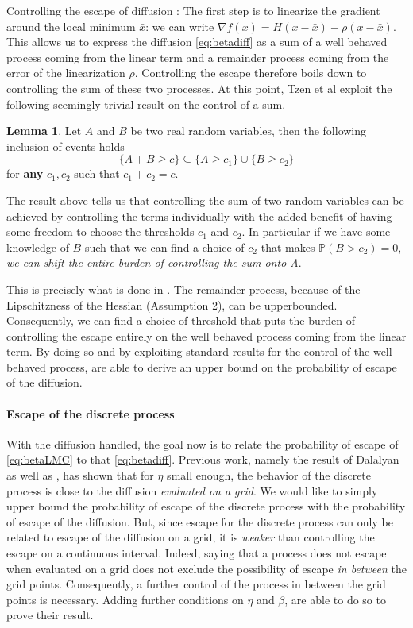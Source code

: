\documentclass[11pt,twoside]{article}
\theoremstyle{definition}
\newtheorem{lemma}[theorem]{Lemma}
\newcommand{\Prb}{\mathbb{P}}
\begin{document}
\begin{paragraph}{Controlling the escape of diffusion :} The first step is to linearize the gradient around the local minimum $\bar{x}$: we can write $\nabla f(x) = H(x-\bar{x}) - \rho(x - \bar{x})$. This allows us to express the diffusion \eqref{eq:betadiff} as a sum of a well behaved process coming from the linear term and a remainder process coming from the error of the linearization $\rho$. Controlling the escape therefore boils down to controlling the sum of these two processes. At this point, Tzen et al exploit the following seemingly trivial result on the control of a sum.
\begin{lemma}
Let $A$ and $B$ be two real random variables, then the following inclusion of events holds 
\[
\{A + B \geq c \} \subseteq  \{A \geq c_1\} \cup \{ B \geq c_2\}
\]
for \textbf{any} $c_1, c_2$ such that $c_1 + c_2 = c$. 
\end{lemma}

The result above tells us that controlling the sum of two random variables can be achieved by controlling the terms individually with the added benefit of having some freedom to choose the thresholds $c_1$ and $c_2$. In particular if we have some knowledge of $B$ such that we can find a choice of $c_2$ that makes $\Prb(B > c_2) = 0$, \textit{we can shift the entire burden of controlling the sum onto A}.

This is precisely what is done in \cite{tzen_local_2018}. The remainder process, because of the Lipschitzness of the Hessian (Assumption 2), can be upperbounded. Consequently, we can find a choice of threshold that puts the burden of controlling the escape entirely on the well behaved process coming from the linear term. By doing so and by exploiting standard results for the control of the well behaved process, \cite{tzen_local_2018} are able to derive an upper bound on the probability of escape of the diffusion. 
\end{paragraph}

\paragraph{Escape of the discrete process} With the diffusion handled, the goal now is to relate the probability of escape of \eqref{eq:betaLMC} to that \eqref{eq:betadiff}. Previous work, namely the result of Dalalyan \cite{dalalyan_theoretical_2016} as well as \cite{raginsky_non-convex_2017}, has shown that for $\eta$ small enough, the behavior of the discrete process is close to the diffusion \textit{evaluated on a grid}. We would like to simply upper bound the probability of escape of the discrete process with the probability of escape of the diffusion. But, since escape for the discrete process can only be related to escape of the diffusion on a grid, it is \emph{weaker} than controlling the escape on a continuous interval. Indeed, saying that a process does not escape when evaluated on a grid does not exclude the possibility of escape \emph{in between} the grid points. Consequently, a further control of the process in between the grid points is necessary. Adding further conditions on $\eta$ and $\beta$, \cite{tzen_local_2018} are able to do so to prove their result.
\end{document}

